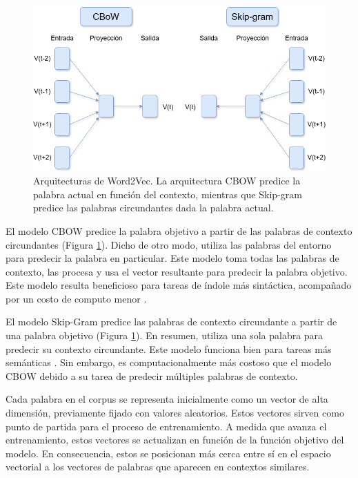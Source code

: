\begin{figure}[H]
    \centering
    \includegraphics[width=1\textwidth]{imagenes/word2vec.drawio.png}
    \caption{Arquitecturas de Word2Vec. La arquitectura CBOW predice la palabra actual en función del contexto, mientras que Skip-gram predice las palabras circundantes dada la palabra actual.}
    \label{fig:word2vec}
\end{figure}


El modelo CBOW predice la palabra objetivo a partir de las palabras de contexto circundantes (Figura \ref{fig:word2vec}). Dicho de otro modo, utiliza las palabras del entorno para predecir la palabra en particular. Este modelo toma todas las palabras de contexto, las procesa y usa el vector resultante para predecir la palabra objetivo. Este modelo resulta beneficioso para tareas de índole más sintáctica, acompañado por un costo de computo menor \parencite{mikolov2013efficientestimationwordrepresentations}.


El modelo Skip-Gram predice las palabras de contexto circundante a partir de una palabra objetivo (Figura \ref{fig:word2vec}). En resumen, utiliza una sola palabra para predecir su contexto circundante.
Este modelo funciona bien para tareas más semánticas \parencite{mikolov2013efficientestimationwordrepresentations}. Sin embargo, es computacionalmente más costoso que el modelo CBOW debido a su tarea de predecir múltiples palabras de contexto.


Cada palabra en el corpus se representa inicialmente como un vector de alta dimensión, previamente fijado con valores aleatorios. Estos vectores sirven como punto de partida para el proceso de entrenamiento. A medida que avanza el entrenamiento, estos vectores se actualizan en función de la función objetivo del modelo. En consecuencia, estos se posicionan más cerca entre sí en el espacio vectorial a los vectores de palabras que aparecen en contextos similares.

